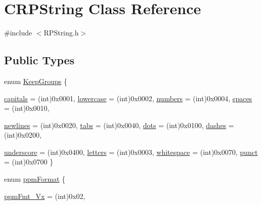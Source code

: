 \hypertarget{classCRPString}{
\section{CRPString Class Reference}
\label{classCRPString}
}


{\ttfamily \#include $<$RPString.h$>$}

\subsection*{Public Types}
\begin{DoxyCompactItemize}
\item 
enum \hyperlink{classCRPString_a824035c48474991b0267f00fae35776d}{KeepGroups} \{ \par
\hyperlink{classCRPString_a824035c48474991b0267f00fae35776da53e9644df524b8aa36b303d56653d7f2}{capitals} =  (int)0x0001, 
\hyperlink{classCRPString_a824035c48474991b0267f00fae35776da38c048edeef94807c77db131b4c127ee}{lowercase} =  (int)0x0002, 
\hyperlink{classCRPString_a824035c48474991b0267f00fae35776dae7a4fbc9875d2819cd4bb2e486c00048}{numbers} =  (int)0x0004, 
\hyperlink{classCRPString_a824035c48474991b0267f00fae35776daf3e51c413ca36ccf13a1c91735055637}{spaces} =  (int)0x0010, 
\par
\hyperlink{classCRPString_a824035c48474991b0267f00fae35776daec8a7ff272c865f42aa275ec52992dbe}{newlines} =  (int)0x0020, 
\hyperlink{classCRPString_a824035c48474991b0267f00fae35776dabe4ce79ab637fda95b6c9b8461c39570}{tabs} =  (int)0x0040, 
\hyperlink{classCRPString_a824035c48474991b0267f00fae35776da71ceeb491b02b6baa3e24075158f8454}{dots} =  (int)0x0100, 
\hyperlink{classCRPString_a824035c48474991b0267f00fae35776da8cd9ca6d933c61edacd2aca6070196e2}{dashes} =  (int)0x0200, 
\par
\hyperlink{classCRPString_a824035c48474991b0267f00fae35776dae5865446433f12b7ca0958b33a04f0bf}{underscore} =  (int)0x0400, 
\hyperlink{classCRPString_a824035c48474991b0267f00fae35776daf04e4c2d019cf8f7686992e683a78964}{letters} =  (int)0x0003, 
\hyperlink{classCRPString_a824035c48474991b0267f00fae35776da35ace468ff829637f5da5e7b5d137df9}{whitespace} =  (int)0x0070, 
\hyperlink{classCRPString_a824035c48474991b0267f00fae35776dab656a2ebbedb69fea3e7750f755b91cd}{punct} =  (int)0x0700
 \}
\item 
enum \hyperlink{classCRPString_a01c768ebc97b32bbd7bdbe6ca227c3a2}{ppmFormat} \{ \par
\hyperlink{classCRPString_a01c768ebc97b32bbd7bdbe6ca227c3a2a0ab35cab83603c06f258545a0f5b3f2f}{ppmFmt\_\-Vx} =  (int)0x02, 

\end{DoxyCompactItemize}
